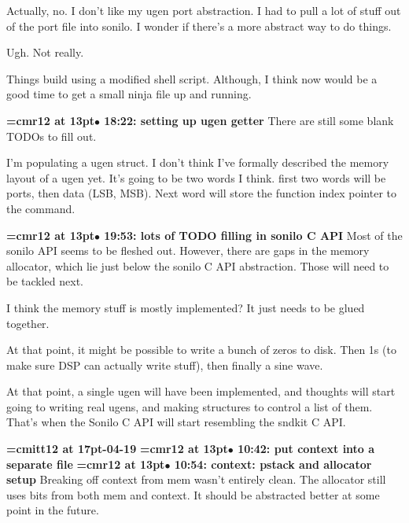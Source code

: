 Actually, no. I don't like my ugen port abstraction. I had to pull a lot of stuff out of the port file into sonilo. I wonder if there's a more abstract way to do things.
\par

Ugh. Not really.
\par

Things build using a modified shell script. Although, I think now would be a good time to get a small ninja file up and running.
\par

{\smallskip\noindent\bf\font\titlefont=cmr12 at 13pt\titlefont $\bullet$ 18:22: setting up ugen getter}\smallskip
There are still some blank TODOs to fill out.
\par

I'm populating a ugen struct. I don't think I've formally described the memory layout of a ugen yet. It's going to be two words I think. first two words will be ports, then data (LSB, MSB). Next word will store the function index pointer to the command.
\par

{\smallskip\noindent\bf\font\titlefont=cmr12 at 13pt\titlefont $\bullet$ 19:53: lots of TODO filling in sonilo C API}\smallskip
Most of the sonilo API seems to be fleshed out. However, there are gaps in the memory allocator, which lie just below the sonilo C API abstraction. Those will need to be tackled next.
\par

I think the memory stuff is mostly implemented? It just needs to be glued together.
\par

At that point, it might be possible to write a bunch of zeros to disk. Then 1s (to make sure DSP can actually write stuff), then finally a sine wave.
\par

At that point, a single ugen will have been implemented, and thoughts will start going to writing real ugens, and making structures to control a list of them. That's when the Sonilo C API will start resembling the sndkit C API.
\par

{\medskip\noindent\bf\font\titlefont=cmitt12 at 17pt-04-19}\medskip
{\smallskip\noindent\bf\font\titlefont=cmr12 at 13pt\titlefont $\bullet$ 10:42: put context into a separate file}\smallskip
{\smallskip\noindent\bf\font\titlefont=cmr12 at 13pt\titlefont $\bullet$ 10:54: context: pstack and allocator setup}\smallskip
Breaking off context from mem wasn't entirely clean. The allocator still uses bits from both mem and context. It should be abstracted better at some point in the future.
\par

